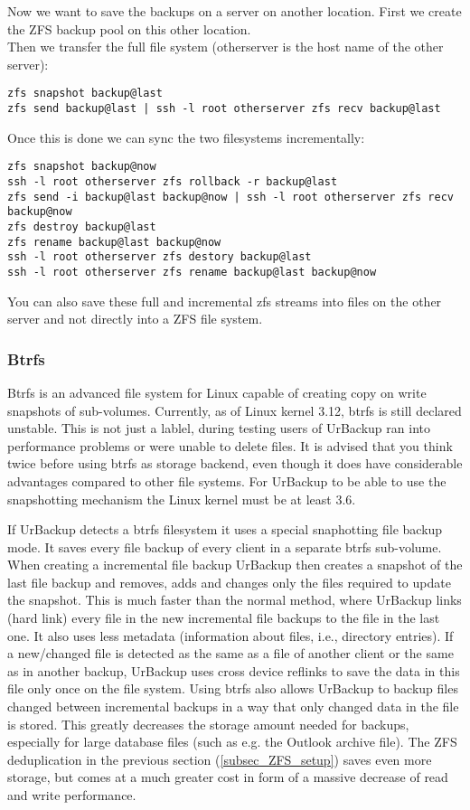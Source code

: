 \documentclass[a4paper,10pt]{article}
\begin{document}
Now we want to save the backups on a server on another location. First we create the ZFS backup pool on this other location.\\
Then we transfer the full file system (otherserver is the host name of the other server):
\begin{verbatim}
zfs snapshot backup@last
zfs send backup@last | ssh -l root otherserver zfs recv backup@last
\end{verbatim}
Once this is done we can sync the two filesystems incrementally:
\begin{verbatim}
zfs snapshot backup@now
ssh -l root otherserver zfs rollback -r backup@last
zfs send -i backup@last backup@now | ssh -l root otherserver zfs recv backup@now
zfs destroy backup@last
zfs rename backup@last backup@now
ssh -l root otherserver zfs destory backup@last
ssh -l root otherserver zfs rename backup@last backup@now
\end{verbatim}
You can also save these full and incremental zfs streams into files on the other server and not directly into a ZFS file system.

\subsubsection{Btrfs}
\label{subsec_btrfs_setup}

Btrfs is an advanced file system for Linux capable of creating copy on write
snapshots of sub-volumes. Currently, as of Linux kernel 3.12, btrfs is still
declared unstable. This is not just a lablel, during testing users of UrBackup
ran into performance problems or were unable to delete files. It is advised that
you think twice before using btrfs as storage backend, even though it does have
considerable advantages compared to other file systems. For UrBackup to be
able to use the snapshotting mechanism the Linux kernel must be at least 3.6.

If UrBackup detects a btrfs filesystem it uses a special snaphotting file backup
mode. It saves every file backup of every client in a separate btrfs sub-volume.
When creating a incremental file backup UrBackup then creates a snapshot of the
last file backup and removes, adds and changes only the files required to update
the snapshot. This is much faster than the normal method, where UrBackup links
(hard link) every file in the new incremental file backups to the file in the
last one. It also uses less metadata (information about files, i.e., directory
entries). If a new/changed file is detected as the same as a file of another
client or the same as in another backup, UrBackup uses cross device reflinks to
save the data in this file only once on the file system. Using btrfs also allows
UrBackup to backup files changed between incremental backups in a way that only
changed data in the file is stored. This greatly decreases the storage amount
needed for backups, especially for large database files (such as e.g. the
Outlook archive file). The ZFS deduplication in the previous section
(\ref{subsec_ZFS_setup}) saves even more storage, but comes at a much greater
cost in form of a massive decrease of read and write performance.\\
\end{document}
